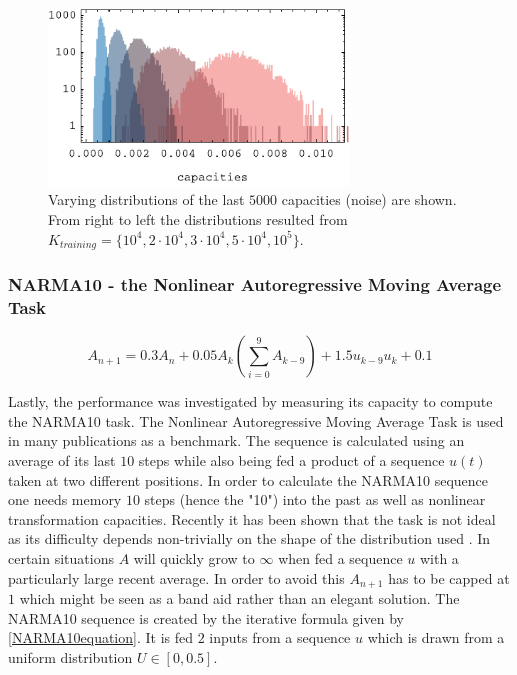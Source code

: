 \begin{figure}
	\centering
	\includegraphics[width=8cm]{pics/noise_distributions}
	\caption{Varying distributions of the last $5000$ capacities (noise) are shown. From right to left the distributions resulted from $K_{training}=\{ 10^4, 2\cdot10^4, 3\cdot10^4, 5\cdot10^4, 10^5 \}$.}
	\label{fig:capacities_noise_distributions}
\end{figure}



\subsubsection{NARMA10 - the Nonlinear Autoregressive Moving Average Task}
\begin{equation}
A_{n+1} = 0.3 A_{n} + 0.05 A_{k}\left( \sum_{i=0}^{9} A_{k-9} \right) +1.5 u_{k-9} u_{k} + 0.1
\label{NARMA10equation}
\end{equation}

Lastly, the performance was investigated by measuring its capacity to compute the NARMA10 task. The Nonlinear Autoregressive Moving Average Task \cite{HER12} is used in many publications as a benchmark. The sequence is calculated using an average of its last $10$ steps while also being fed a product of a sequence $u(t)$ taken at two different positions. In order to calculate the NARMA10 sequence one needs memory $10$ steps (hence the "10") into the past as well as nonlinear transformation capacities. Recently it has been shown that the task is not ideal as its difficulty depends non-trivially on the shape of the distribution used \cite{KUB19}. In certain situations $A$ will quickly grow to $\infty$ when fed a sequence $u$ with a particularly large recent average. In order to avoid this $A_{n+1}$ has to be capped at $1$ which might be seen as a band aid rather than an elegant solution.
The NARMA10 sequence is created by the iterative formula given by \ref{NARMA10equation}. It is fed $2$ inputs from a sequence $u$ which is drawn from a uniform distribution $U \in [0,0.5]$.



